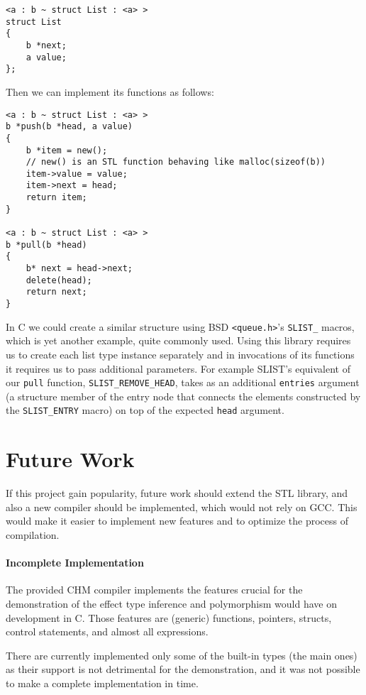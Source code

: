 \begin{lstlisting}
<a : b ~ struct List : <a> >
struct List
{
    b *next;
    a value;
};
\end{lstlisting}

Then we can implement its functions as follows:

\begin{lstlisting}
<a : b ~ struct List : <a> >
b *push(b *head, a value)
{
    b *item = new();
    // new() is an STL function behaving like malloc(sizeof(b))
    item->value = value;
    item->next = head;
    return item;
}

<a : b ~ struct List : <a> >
b *pull(b *head)
{
    b* next = head->next;
    delete(head);
    return next;
}
\end{lstlisting}

In C we could create a similar structure using BSD \lstinline{<queue.h>}'s \cite{pages2007queue} \lstinline{SLIST_} macros, which is yet another example, quite commonly used. Using this library requires us to create each list type instance separately and in invocations of its functions it requires us to pass additional parameters. For example SLIST's equivalent of our \lstinline{pull} function, \lstinline{SLIST_REMOVE_HEAD}, takes as an additional \lstinline{entries} argument (a structure member of the entry node that connects the elements constructed by the \lstinline{SLIST_ENTRY} macro) on top of the expected \lstinline{head} argument.

\section{Future Work}

If this project gain popularity, future work should extend the STL library, and also a new compiler should be implemented, which would not rely on GCC. This would make it easier to implement new features and to optimize the process of compilation.

\paragraph{Incomplete Implementation}

The provided CHM compiler implements the features crucial for the demonstration of the effect type inference and polymorphism would have on development in C. Those features are (generic) functions, pointers, structs, control statements, and almost all expressions.

There are currently implemented only some of the built-in types (the main ones) as their support is not detrimental for the demonstration, and it was not possible to make a complete implementation in time.


